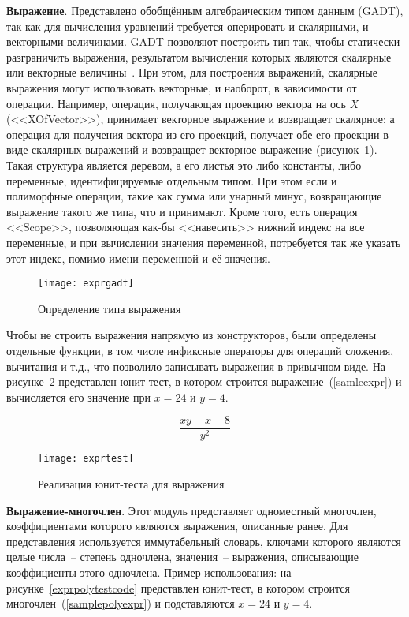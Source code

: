 \textbf{Выражение}.\label{exprdescr}
Представлено обобщённым алгебраическим типом данным (GADT), так как для вычисления уравнений требуется
оперировать и скалярными, и векторными величинами. GADT позволяют построить тип так, чтобы статически разграничить выражения,
результатом вычисления которых являются скалярные или векторные величины~\cite{rwo-gadt}. При этом, для построения выражений, скалярные выражения
могут использовать векторные, и наоборот, в зависимости от операции. Например, операция, получающая проекцию вектора на ось \(X\) (<<XOfVector>>),
принимает векторное выражение и возвращает скалярное; а операция для получения вектора из его проекций, получает обе его проекции в виде скалярных выражений
и возвращает векторное выражение (рисунок~\ref{exprgadtcode}). Такая структура является деревом, а его листья это либо константы, либо
переменные, идентифицируемые отдельным типом. При этом если и полиморфные операции, такие как сумма или унарный минус, возвращающие выражение
такого же типа, что и принимают. Кроме того, есть операция <<Scope>>, позволяющая как-бы <<навесить>> нижний индекс на все переменные,
и при вычислении значения переменной, потребуется так же указать этот индекс, помимо имени переменной и её значения.

\begin{figure}[H]
    \centering
    \texttt{[image: exprgadt]}
    \caption{Определение типа выражения\label{exprgadtcode}}
\end{figure}

Чтобы не строить выражения напрямую из конструкторов, были определены отдельные функции, в том числе инфиксные операторы для операций сложения, вычитания и т.д.,
что позволило записывать выражения в привычном виде. На рисунке~\ref{exprtestfig} представлен юнит-тест, в котором строится выражение~(\ref{samleexpr}) и вычисляется
его значение при \(x = 24\) и \(y = 4\).

\begin{equation}\label{samleexpr}
    \frac{xy - x + 8}{y^2}
\end{equation}

\vspace{-2em}

\begin{figure}[H]
    \centering
    \texttt{[image: exprtest]}
    \caption{Реализация юнит-теста для выражения\label{exprtestfig}}
\end{figure}

\textbf{Выражение-многочлен}.\label{exprpolydescr}
Этот модуль представляет одноместный многочлен, коэффициентами которого
являются выражения, описанные ранее. Для представления используется иммутабельный словарь, ключами которого являются целые числа~-- степень одночлена,
значения~-- выражения, описывающие коэффициенты этого одночлена. Пример использования: на рисунке~\ref{exprpolytestcode} представлен юнит-тест, в котором строится
многочлен~(\ref{samplepolyexpr}) и подставляются \(x = 24\) и \(y = 4\).

